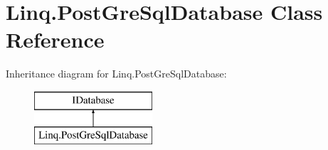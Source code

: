 \hypertarget{class_linq_1_1_post_gre_sql_database}{}\section{Linq.\+Post\+Gre\+Sql\+Database Class Reference}
\label{class_linq_1_1_post_gre_sql_database}
Inheritance diagram for Linq.\+Post\+Gre\+Sql\+Database\+:\begin{figure}[H]
\begin{center}
\leavevmode
\includegraphics[height=2.000000cm]{class_linq_1_1_post_gre_sql_database}
\end{center}
\end{figure}
